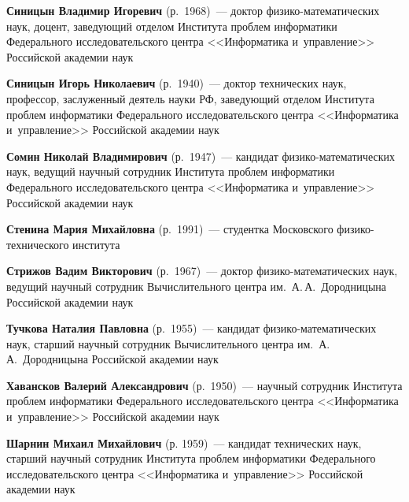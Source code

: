 \begin{multicols}{2}
 \vspace*{3pt}

 \noindent
\textbf{Синицын Владимир Игоревич} (р.\ 1968)~---
доктор фи\-зи\-ко-ма\-те\-ма\-ти\-че\-ских
  наук, доцент, заведующий отделом Института проб\-лем информатики
  Федерального исследовательского центра <<Информатика и~управ\-ле\-ние>>
  Российской академии наук

  \vspace*{3pt}

   \noindent
\textbf{Синицын Игорь Николаевич} (р.\ 1940)~---
доктор технических наук, профессор, заслуженный деятель науки РФ,
заведующий отделом Института проб\-лем информатики Федерального
исследовательского центра <<Информатика и~управ\-ле\-ние>> Российской академии наук

 \vspace*{3pt}
 \noindent
\textbf{Сомин Николай Владимирович} (р.\ 1947)~---
кандидат фи\-зи\-ко-ма\-те\-ма\-ти\-че\-ских наук, ведущий научный сотрудник
Института проблем информатики Федерального исследовательского центра
<<Информатика и~управ\-ле\-ние>>   Российской академии наук

\pagebreak

\noindent
\textbf{Стенина Мария Михайловна} (р.\ 1991)~---
студентка Московского физико-технического института

 \vspace*{3pt}

 \noindent
\textbf{Стрижов Вадим Викторович} (р.\ 1967)~---
доктор фи\-зи\-ко-ма\-те\-ма\-ти\-че\-ских наук, ведущий научный сотрудник
Вычислительного центра им.\ А.\,А.~Дородницына
Российской академии наук




\noindent
\textbf{Тучкова Наталия Павловна} (р.\ 1955)~---
 кандидат фи\-зи\-ко-ма\-те\-ма\-ти\-че\-ских наук, старший научный
 сотрудник Вычислительного центра им.\ А.\,А.~Дородницына  Российской академии наук

 \vspace*{4pt}



 \noindent
\textbf{Хавансков Валерий Александрович} (р.\ 1950)~---
научный сотрудник Института
проблем информатики Федерального исследовательского центра <<Информатика и~управ\-ление>>
Российской академии наук

 \vspace*{4pt}

 \noindent
\textbf{Шарнин Михаил Михайлович} (р. 1959)~--- кандидат технических наук,
старший научный сотрудник Института проблем информатики Федерального
исследовательского центра <<Информатика и~управ\-ле\-ние>>   Российской академии наук


\end{multicols}
